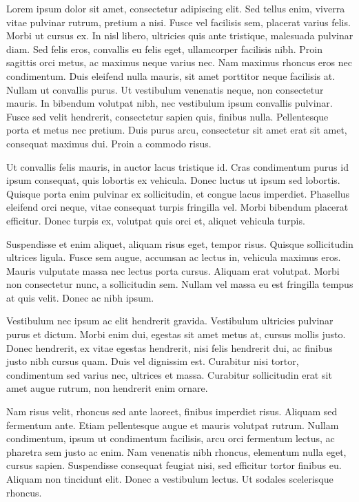 Lorem ipsum dolor sit amet, consectetur adipiscing elit. Sed tellus enim, viverra vitae pulvinar rutrum, pretium a nisi. Fusce vel facilisis sem, placerat varius felis. Morbi ut cursus ex. In nisl libero, ultricies quis ante tristique, malesuada pulvinar diam. Sed felis eros, convallis eu felis eget, ullamcorper facilisis nibh. Proin sagittis orci metus, ac maximus neque varius nec. Nam maximus rhoncus eros nec condimentum. Duis eleifend nulla mauris, sit amet porttitor neque facilisis at. Nullam ut convallis purus. Ut vestibulum venenatis neque, non consectetur mauris. In bibendum volutpat nibh, nec vestibulum ipsum convallis pulvinar. Fusce sed velit hendrerit, consectetur sapien quis, finibus nulla. Pellentesque porta et metus nec pretium. Duis purus arcu, consectetur sit amet erat sit amet, consequat maximus dui. Proin a commodo risus.

Ut convallis felis mauris, in auctor lacus tristique id. Cras condimentum purus id ipsum consequat, quis lobortis ex vehicula. Donec luctus ut ipsum sed lobortis. Quisque porta enim pulvinar ex sollicitudin, et congue lacus imperdiet. Phasellus eleifend orci neque, vitae consequat turpis fringilla vel. Morbi bibendum placerat efficitur. Donec turpis ex, volutpat quis orci et, aliquet vehicula turpis.

Suspendisse et enim aliquet, aliquam risus eget, tempor risus. Quisque sollicitudin ultrices ligula. Fusce sem augue, accumsan ac lectus in, vehicula maximus eros. Mauris vulputate massa nec lectus porta cursus. Aliquam erat volutpat. Morbi non consectetur nunc, a sollicitudin sem. Nullam vel massa eu est fringilla tempus at quis velit. Donec ac nibh ipsum.

Vestibulum nec ipsum ac elit hendrerit gravida. Vestibulum ultricies pulvinar purus et dictum. Morbi enim dui, egestas sit amet metus at, cursus mollis justo. Donec hendrerit, ex vitae egestas hendrerit, nisi felis hendrerit dui, ac finibus justo nibh cursus quam. Duis vel dignissim est. Curabitur nisi tortor, condimentum sed varius nec, ultrices et massa. Curabitur sollicitudin erat sit amet augue rutrum, non hendrerit enim ornare.

Nam risus velit, rhoncus sed ante laoreet, finibus imperdiet risus. Aliquam sed fermentum ante. Etiam pellentesque augue et mauris volutpat rutrum. Nullam condimentum, ipsum ut condimentum facilisis, arcu orci fermentum lectus, ac pharetra sem justo ac enim. Nam venenatis nibh rhoncus, elementum nulla eget, cursus sapien. Suspendisse consequat feugiat nisi, sed efficitur tortor finibus eu. Aliquam non tincidunt elit. Donec a vestibulum lectus. Ut sodales scelerisque rhoncus. 



